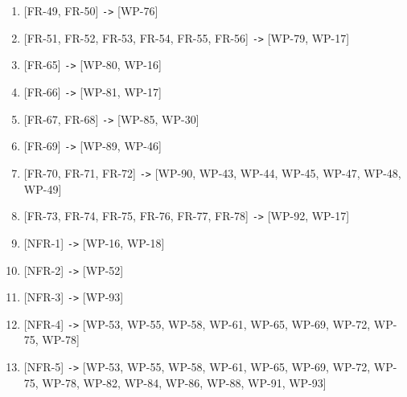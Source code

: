 \documentclass[a4paper, 12pt, oneside]{book}
\begin{document}
\begin{enumerate}[label = -]
	\item {[FR-49, FR-50] \texttt{->} [WP-76]}
	\item {[FR-51, FR-52, FR-53, FR-54, FR-55, FR-56] \texttt{->} [WP-79, WP-17]}
	\item {[FR-65] \texttt{->} [WP-80, WP-16]}
	\item {[FR-66] \texttt{->} [WP-81, WP-17]}
	\item {[FR-67, FR-68] \texttt{->} [WP-85, WP-30]}
	\item {[FR-69] \texttt{->} [WP-89, WP-46]}
	\item {[FR-70, FR-71, FR-72] \texttt{->} [WP-90, WP-43, WP-44, WP-45, WP-47, WP-48, WP-49]}
	\item {[FR-73, FR-74, FR-75, FR-76, FR-77, FR-78] \texttt{->} [WP-92, WP-17]}
	\item {[NFR-1] \texttt{->} [WP-16, WP-18]}
	\item {[NFR-2] \texttt{->} [WP-52]}
	\item {[NFR-3] \texttt{->} [WP-93]}
	\item {[NFR-4] \texttt{->} [WP-53, WP-55, WP-58, WP-61, WP-65, WP-69, WP-72, WP-75, WP-78]}
	\item {[NFR-5] \texttt{->} [WP-53, WP-55, WP-58, WP-61, WP-65, WP-69, WP-72, WP-75, WP-78, WP-82, WP-84, WP-86, WP-88, WP-91, WP-93]}
\end{enumerate}
\end{document}
